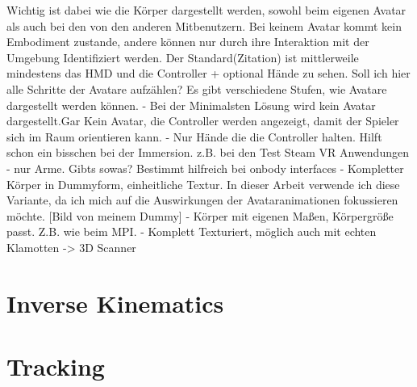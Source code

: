 Wichtig ist dabei wie die Körper dargestellt werden, sowohl beim eigenen Avatar als auch bei den von den anderen Mitbenutzern. Bei keinem Avatar kommt kein Embodiment zustande, andere können nur durch ihre Interaktion mit der Umgebung Identifiziert werden. Der Standard(Zitation) ist mittlerweile mindestens das HMD und die Controller + optional Hände zu sehen. \cite{Benford2010}
Soll ich hier alle Schritte der Avatare aufzählen?
Es gibt verschiedene Stufen, wie Avatare dargestellt werden können.
- Bei der Minimalsten Lösung wird kein Avatar dargestellt.Gar Kein Avatar, die Controller werden angezeigt, damit der Spieler sich im Raum orientieren kann.
- Nur Hände die die Controller halten. Hilft schon ein bisschen bei der Immersion. z.B. bei den Test Steam VR Anwendungen
- nur Arme. Gibts sowas? Bestimmt hilfreich bei onbody interfaces
- Kompletter Körper in Dummyform, einheitliche Textur. In dieser Arbeit verwende ich diese Variante, da ich mich auf die Auswirkungen der Avataranimationen fokussieren möchte. 
[Bild von meinem Dummy]
- Körper mit eigenen Maßen, Körpergröße passt. Z.B. wie beim MPI. 
- Komplett Texturiert, möglich auch mit echten Klamotten -> 3D Scanner

\section{Inverse Kinematics}

\section{Tracking}






